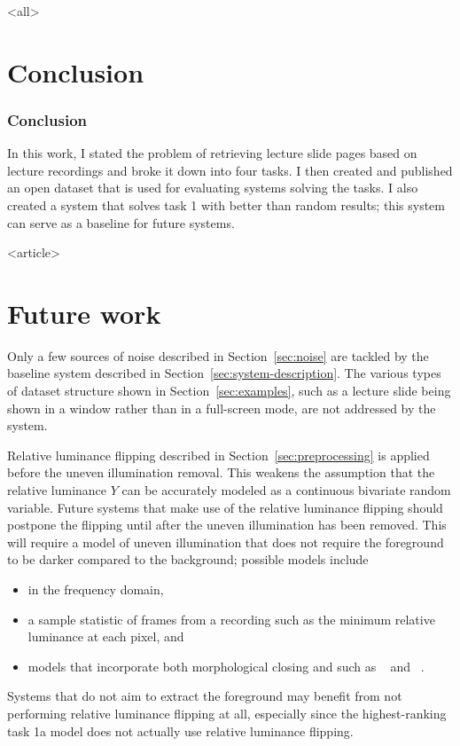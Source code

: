 \mode
<all>

\section{Conclusion}
\label{sec:conclusion}
\begin{frame}
\frametitle<presentation>{Conclusion}
In this work, I stated the problem of retrieving lecture slide pages based on
lecture recordings and broke it down into four tasks. I then created and
published an open dataset that is used for evaluating systems solving the
tasks. I also created a system that solves task 1 with better than random
results; this system can serve as a baseline for future systems.
\end{frame}

\mode
<article>

\section{Future work}
\label{sec:future-work}
Only a few sources of noise described in Section~\ref{sec:noise} are tackled by
the baseline system described in Section~\ref{sec:system-description}. The
various types of dataset structure shown in Section~\ref{sec:examples}, such as
a lecture slide being shown in a window rather than in a full-screen mode, are
not addressed by the system.

Relative luminance flipping described in Section~\ref{sec:preprocessing} is
applied before the uneven illumination removal. This weakens the assumption that
the relative luminance $Y$ can be accurately modeled as a continuous bivariate
random variable. Future systems that make use of the relative luminance
flipping should postpone the flipping until after the uneven illumination has
been removed. This will require a model of uneven illumination that does not
require the foreground to be darker compared to the background; possible models
include
\begin{itemize}
  \item {} in the frequency domain,
  \item a sample statistic of frames from a recording such as the minimum
    relative luminance at each pixel, and
  \item models that incorporate both morphological closing and
     such as
    ~\cite[sec.~8.5]{soille2013morphological} and
    ~\cite[sec.~8.2.2]{soille2013morphological}.
\end{itemize}
Systems that do not aim to extract the foreground may benefit from not
performing relative luminance flipping at all, especially since the
highest-ranking task 1a model does not actually use relative luminance flipping.

